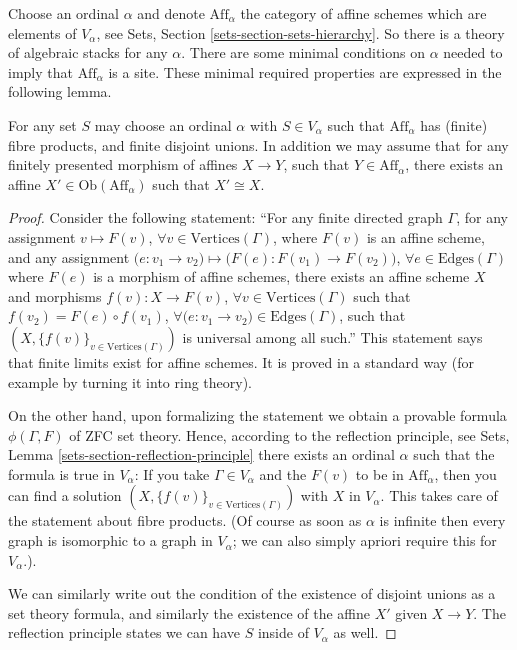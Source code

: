 \noindent
Choose an ordinal $\alpha$ and denote $\text{Aff}_\alpha$ the
category of affine schemes which are elements of $V_\alpha$, see
Sets, Section \ref{sets-section-sets-hierarchy}. So there is a
theory of algebraic stacks for any $\alpha$. There are some minimal
conditions on $\alpha$ needed to imply that $\text{Aff}_\alpha$ is a site. 
These minimal required properties are expressed in the following lemma.

\begin{lemma}
\label{lemma-Aff-site}
For any set $S$ may choose an ordinal $\alpha$ with $S \in V_\alpha$ 
such that $\text{Aff}_\alpha$ has (finite) fibre products, and finite disjoint
unions. In addition we may assume that for any finitely presented morphism
of affines $X \to Y$, such that $Y \in \text{Aff}_\alpha$, there exists
an affine $X' \in \text{Ob}(\text{Aff}_\alpha)$ such that $X' \cong X$.
\end{lemma}

\begin{proof}
Consider the following statement: ``For any finite directed graph $\Gamma$,
for any assignment $v \mapsto F(v)$, $\forall v\in \text{Vertices}(\Gamma)$,
where $F(v)$ is an affine scheme, and any assignment
$\big(e : v_1 \to v_2\big) \mapsto \big(F(e) : F(v_1) \to F(v_2)\big)$,
$\forall e \in \text{Edges}(\Gamma)$ where $F(e)$ is a morphism of affine
schemes, there exists an affine scheme $X$ and morphisms $f(v) : X \to F(v)$,
$\forall v\in \text{Vertices}(\Gamma)$ such that $f(v_2) = F(e) \circ f(v_1)$,
$\forall \big(e : v_1 \to v_2\big) \in \text{Edges}(\Gamma)$, such that
$(X, \{f(v)\}_{v\in \text{Vertices}(\Gamma)})$ is universal among all such.''
This statement says that finite limits exist for affine schemes. It is
proved in a standard way (for example by turning it into ring theory).

\medskip\noindent
On the other hand, upon formalizing the statement we obtain a provable
formula $\phi(\Gamma, F)$ of ZFC set theory. Hence, according to the reflection
principle, see Sets, Lemma \ref{sets-section-reflection-principle}
there exists an ordinal $\alpha$ such that the formula is true in
$V_\alpha$: If you take $\Gamma \in V_\alpha$ and the $F(v)$ to be in
$\text{Aff}_\alpha$, then you can find a solution
$(X, \{f(v)\}_{v\in \text{Vertices}(\Gamma)})$
with $X$ in $V_\alpha$. This takes care of the statement about fibre 
products. (Of course as soon as $\alpha$ is infinite then every
graph is isomorphic to a graph in $V_\alpha$; we can also simply apriori
require this for $V_\alpha$.).

\medskip\noindent
We can similarly write out the condition of the existence of disjoint unions
as a set theory formula, and similarly the existence of the affine $X'$
given $X \to Y$. The reflection principle states we can have $S$ inside of
$V_\alpha$ as well.
\end{proof}

